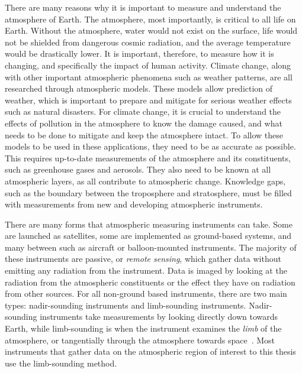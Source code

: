 There are many reasons why it is important to measure and understand the atmosphere of Earth. The atmosphere, most importantly, is critical to all life on Earth. Without the atmosphere, water would not exist on the surface, life would not be shielded from dangerous cosmic radiation, and the average temperature would be drastically lower. It is important, therefore, to measure how it is changing, and specifically the impact of human activity. Climate change, along with other important atmospheric phenomena such as weather patterns, are all researched through atmospheric models. These models allow prediction of weather, which is important to prepare and mitigate for serious weather effects such as natural disasters. For climate change, it is crucial to understand the effects of pollution in the atmosphere to know the damage caused, and what needs to be done to mitigate and keep the atmosphere intact. To allow these models to be used in these applications, they need to be as accurate as possible. This requires up-to-date measurements of the atmosphere and its constituents, such as greenhouse gases and aerosols. They also need to be known at all atmospheric layers, as all contribute to atmospheric change. Knowledge gaps, such as the boundary between the troposphere and stratosphere, must be filled with measurements from new and developing atmospheric instruments.

There are many forms that atmospheric measuring instruments can take. Some are launched as satellites, some are implemented as ground-based systems, and many between such as aircraft or balloon-mounted instruments. The majority of these instruments are passive, or \textit{remote sensing}, which gather data without emitting any radiation from the instrument. Data is imaged by looking at the radiation from the atmospheric constituents or the effect they have on radiation from other sources. For all non-ground based instruments, there are two main types: nadir-sounding instruments and limb-sounding instruments. Nadir-sounding instruments take measurements by looking directly down towards Earth, while limb-sounding is when the instrument examines the \textit{limb} of the atmosphere, or tangentially through the atmosphere towards space~\citep{SPARC}. Most instruments that gather data on the atmospheric region of interest to this thesis use the limb-sounding method.

